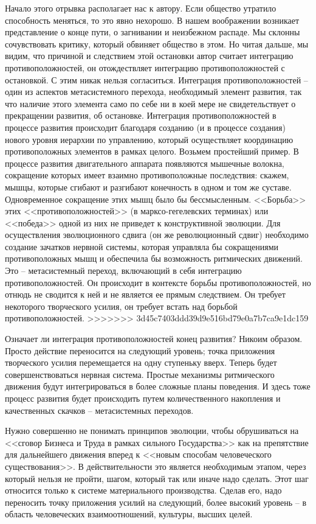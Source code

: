 \documentclass{book}
\begin{document}
{Начало этого отрывка располагает нас к автору. Если обще­ство утратило способность меняться, то это явно нехорошо. В нашем воображении возникает представление о конце пути, о загнивании и неизбежном распаде. Мы склонны сочувство­вать критику, который обвиняет общество в этом. Но читая дальше, мы видим, что причиной и следствием этой остановки автор считает интеграцию противоположностей, он отождест­вляет интеграцию противоположностей с остановкой. С этим никак нельзя согласиться. Интеграция противоположностей -- один из аспектов метасистемного перехода, необходимый эле­мент развития, так что наличие этого элемента само по себе ни в коей мере не свидетельствует о прекращении развития, об остановке. Интеграция противоположностей в процессе раз­вития происходит благодаря созданию (и в процессе создания) нового уровня иерархии по управлению, который осуществля­ет координацию противоположных элементов в рамках целого. Возьмем простейший пример. В процессе развития двигатель­ного аппарата появляются мышечные 
волокна, сокращение ко­торых имеет взаимно противоположные последствия: скажем, мышцы, которые сгибают и разгибают конечность в одном и том же суставе. Одновременное сокращение этих мышц было бы бессмысленным. <<Борьба>> этих <<противоположностей>> (в марксо-гегелевских терминах) или <<победа>> одной из них не приведет к конструктивной эволюции. Для осуществления эволюционного сдвига (он же революционный сдвиг) необхо­димо создание зачатков нервной системы, которая управляла бы сокращениями противоположных мышц и обеспечила бы возможность ритмических движений. Это -- метасистемный переход, включающий в себя интеграцию противоположностей. Он происходит в контексте  борьбы противоположностей, но отнюдь не сводится  к ней и не является ее прямым следствием. Он требует некоторого творческого усилия, он требует встать над  борьбой противоположностей.
>>>>>>> 3d45c7403ddd39d9e516bd79e0a7b7ca9e1dc159

Означает ли интеграция противоположностей конец разви­тия? Никоим образом. Просто действие переносится на следу­ющий уровень; точка приложения творческого усилия переме­щается на одну ступеньку вверх. Теперь будет совершенство­ваться нервная система. Простые механизмы ритмического движения будут интегрироваться в более сложные планы по­ведения. И здесь тоже процесс развития будет происходить пу­тем количественного накопления и качественных скачков -- метасистемных переходов.

Нужно совершенно не понимать принципов эволюции, что­бы обрушиваться на <<сговор Бизнеса и Труда в рамках силь­ного Государства>> как на препятствие для дальнейшего дви­жения вперед к <<новым способам человеческого существова­ния>>. В действительности это является необходимым этапом, через который нельзя не пройти, шагом, который так или ина­че надо сделать. Этот шаг относится только к системе матери­ального производства. Сделав его, надо переносить точку при­ложения усилий на следующий, более высокий уровень -- в об­ласть человеческих взаимоотношений, культуры, высших целей.

}
\end{document}

